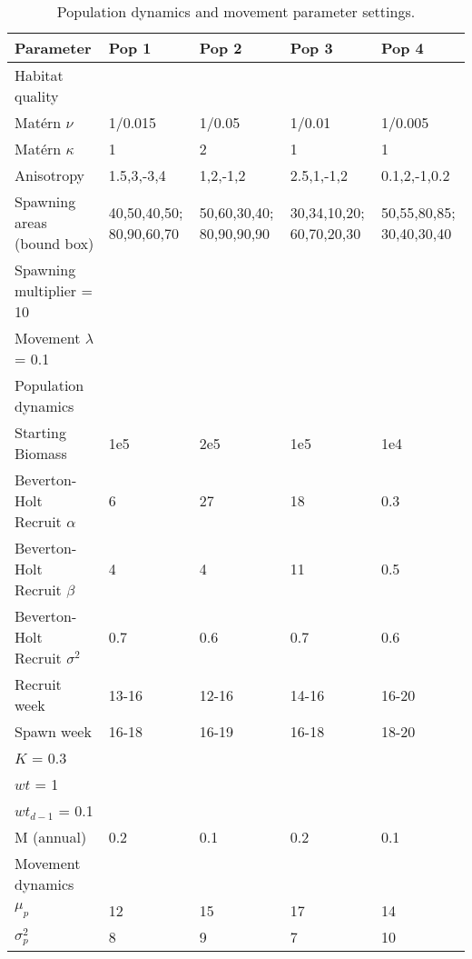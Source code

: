 \begin{table}[!ht]
\caption{Population dynamics and movement parameter settings.}
	\begin{tabular}{ p{4cm } p{2cm} p{2cm} p{2cm} p{2cm}}
	Parameter & Pop 1 & Pop 2 & Pop 3 & Pop 4 \\
	\hline
	Habitat quality & & & \\
	\hline
	Matérn $\nu$ & 1/0.015 & 1/0.05 & 1/0.01 & 1/0.005  \\
	Matérn $\kappa$ & 1 & 2 & 1 & 1  \\
	Anisotropy & 1.5,3,-3,4 & 1,2,-1,2 & 2.5,1,-1,2 & 0.1,2,-1,0.2 \\
	Spawning areas (bound box) & 40,50,40,50; 80,90,60,70 &
	50,60,30,40; 80,90,90,90 & 30,34,10,20; 60,70,20,30 & 50,55,80,85; 30,40,30,40 \\
	Spawning multiplier = 10 & & & & \\
	Movement $\lambda$ = 0.1 & & & & \\
	\hline
	Population dynamics & & & & \\
	\hline
	Starting Biomass & 1e5 & 2e5 & 1e5 & 1e4 \\
	Beverton-Holt Recruit $\alpha$ & 6 & 27 & 18 & 0.3  \\
	Beverton-Holt Recruit $\beta$ & 4 & 4 & 11 & 0.5 \\
	Beverton-Holt Recruit $\sigma^2$ & 0.7 & 0.6 & 0.7 & 0.6 \\
	Recruit week & 13-16 & 12-16 & 14-16 & 16-20 \\
	Spawn week & 16-18 & 16-19 & 16-18 & 18-20 \\
	$K$ = 0.3 & & & & \\
	$wt$ = 1 & & & & \\
	$wt_{d-1}$ = 0.1 & & & &  \\
	M (annual) & 0.2 & 0.1 & 0.2 & 0.1 \\
	\hline
	Movement dynamics & & & & \\
	\hline
	$\mu_{p}$ & 12 & 15 & 17 & 14 \\
	$\sigma_{p}^2$ & 8 & 9 & 7 & 10 \\
	\hline
\end{tabular}
\label{tab:1}
\end{table}

